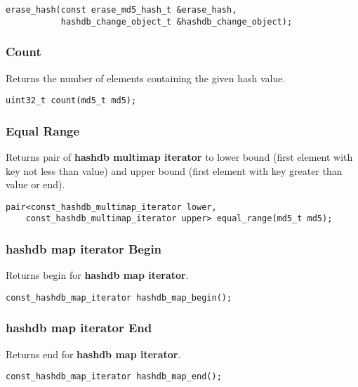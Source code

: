 \documentclass[12pt,twoside]{article}
\newcommand{\hmi}{\textbf{hashdb map iterator}\xspace}
\newcommand{\hmmi}{\textbf{hashdb multimap iterator}\xspace}
\begin{document}
\begin{small}
\begin{verbatim}
erase_hash(const erase_md5_hash_t &erase_hash,
           hashdb_change_object_t &hashdb_change_object);
\end{verbatim}
\end{small}

\subsubsection{Count}
Returns the number of elements containing the given hash value.

\begin{small}
\begin{verbatim}
uint32_t count(md5_t md5);
\end{verbatim}
\end{small}

\subsubsection{Equal Range}
Returns pair of \hmmi to lower bound
(first element with key not less than value)
and upper bound (first element with key greater than value or end).

\begin{small}
\begin{verbatim}
pair<const_hashdb_multimap_iterator lower,
    const_hashdb_multimap_iterator upper> equal_range(md5_t md5);
\end{verbatim}
\end{small}

\subsubsection{\hmi Begin}
Returns begin for \hmi.

\begin{small}
\begin{verbatim}
const_hashdb_map_iterator hashdb_map_begin();
\end{verbatim}
\end{small}

\subsubsection{\hmi End}
Returns end for \hmi.

\begin{small}
\begin{verbatim}
const_hashdb_map_iterator hashdb_map_end();
\end{verbatim}
\end{small}
\end{document}
